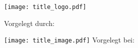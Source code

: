 \begin{titlepage}
  \centering
  \texttt{[image: title\_logo.pdf]}\\[.25cm]
  {\scshape\paperinstitution\par}
  \vspace{1cm}
  {\scshape\Large\papertype\par}
  \vspace{1.5cm}
  {\huge\bfseries\papertitle\par}
  \vspace{2cm}
  {\Large Vorgelegt durch:\par\paperauthor\par}
  \vfill
  \texttt{[image: title\_image.pdf]}
  \vfill
  Vorgelegt bei:\par
  {\sc\papersupervisor\par}
  \vspace{1cm}
  {\large\paperdate\par}
\end{titlepage}
